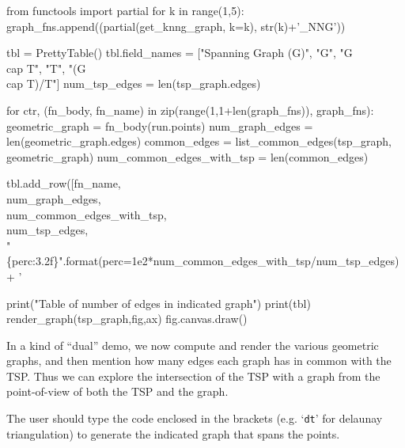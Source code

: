 from functools import partial
for k in range(1,5): 
   graph_fns.append((partial(get_knng_graph, k=k), str(k)+'_NNG'))

tbl             = PrettyTable()
tbl.field_names = ["Spanning Graph (G)", "G", "G \\cap T", "T", "(G \\cap T)/T"]
num_tsp_edges   = len(tsp_graph.edges)

for ctr, (fn_body, fn_name) in zip(range(1,1+len(graph_fns)), graph_fns):
     geometric_graph = fn_body(run.points)
     num_graph_edges = len(geometric_graph.edges)
     common_edges    = list_common_edges(tsp_graph, geometric_graph)
     num_common_edges_with_tsp = len(common_edges)

     tbl.add_row([fn_name,                 \\
                num_graph_edges,           \\
                num_common_edges_with_tsp, \\
                num_tsp_edges,             \\
                "\{perc:3.2f\}".format(perc=1e2*num_common_edges_with_tsp/num_tsp_edges)+ ' %
                
print("Table of number of edges in indicated graph")
print(tbl)
render_graph(tsp_graph,fig,ax)
fig.canvas.draw()
\nwendcode{}\nwdocspar

In a kind of ``dual'' demo, we now compute and render the various geometric graphs, and then mention how many 
edges each graph has in common with the TSP. Thus we can explore the intersection of the TSP with a graph
from the point-of-view of both the TSP and the graph. 

The user should type the code enclosed in the brackets (e.g. `\verb|dt|' for delaunay triangulation) to generate the 
indicated graph that spans the points. 

